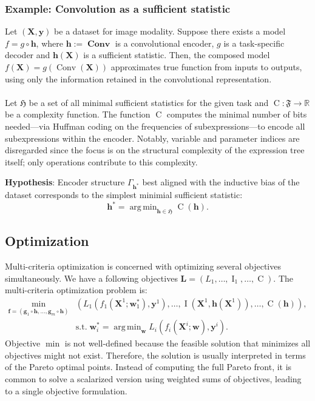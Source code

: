 \documentclass[14pt]{extarticle}
\DeclareMathOperator*{\argmin}{arg\,min}
\begin{document}
        \subsubsection{Example: Convolution as a sufficient statistic}
        Let \((\mathbf{X}, \mathbf{y})\) be a dataset for image modality. Suppose there exists a model \(f = g \circ \mathbf{h}\), where \(\mathbf{h} := \operatorname{\textbf{Conv}}\) is a convolutional encoder, \(g\) is a task-specific decoder and \(\mathbf{h}(\mathbf{X})\) is a sufficient statistic. Then, the composed model \(f(\mathbf{X}) = g(\operatorname{Conv}(\mathbf{X}))\) approximates true function from inputs to outputs, using only the information retained in the convolutional representation. 
        \\
        \\
        Let \(\mathfrak{H}\) be a set of all minimal sufficient statistics for the given task and \(\operatorname{C}: \mathfrak{F} \rightarrow \mathbb{R}\) be a complexity function. The function \(\operatorname{C}\) computes the minimal number of bits needed---via Huffman coding on the frequencies of subexpressions---to encode all subexpressions within the encoder. Notably, variable and parameter indices are disregarded since the focus is on the structural complexity of the expression tree itself; only operations contribute to this complexity.
        
        \textbf{Hypothesis}: Encoder structure \(\Gamma_{\mathbf{h}^*}\) best aligned with the inductive bias of the dataset corresponds to the simplest minimial sufficient statistic:
        \[
            \mathbf{h}^* = \argmin_{\mathbf{h} \in \mathfrak{H}} \operatorname{C}(\mathbf{h}).
        \]

        \subsection{Optimization}
        Multi-criteria optimization is concerned with optimizing several objectives simultaneously. 
        We have a following objectives \(\mathbf{L} = (L_1, \dots, \operatorname{I}_1, \dots, \operatorname{C})\). 
        The multi-criteria optimization problem is: 
        \begin{align*}
             \min_{\mathbf{f} = (\mathbf{g}_1 \circ \mathbf{h}, \dots, \mathbf{g}_m \circ \mathbf{h})} & \left(L_1\left(f_1(\mathbf{X}^1; \mathbf{w}^*_1), \mathbf{y}^1\right), \dots, \operatorname{I}\left(\mathbf{X}^1, \mathbf{h}(\mathbf{X}^1)\right), \dots, \operatorname{C}(\mathbf{h})\right), \\ 
            & \text{s.t.} \; 
            \mathbf{w}^*_i = \argmin_{\mathbf{w}} L_i(f_i(\mathbf{X}^i; \mathbf{w}), \mathbf{y}^i).
        \end{align*}
        Objective \(\min\) is not well-defined because the feasible solution that minimizes all objectives might not exist. Therefore, the solution is usually interpreted in terms of the Pareto optimal points. Instead of computing the full Pareto front, it is common to solve a scalarized version using weighted sums of objectives, leading to a single objective formulation. 
        
\end{document}
